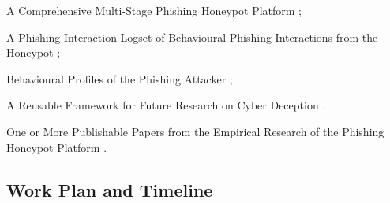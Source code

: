 A Comprehensive Multi-Stage Phishing Honeypot Platform \cite{Moric2025Honeypots};

A Phishing Interaction Logset of Behavioural Phishing Interactions from the Honeypot \cite{Song2005HoneyStat};

Behavioural Profiles of the Phishing Attacker \cite{Holz2006AttackPatterns};

A Reusable Framework for Future Research on Cyber Deception \cite{Moric2025Honeypots,Bringer2012HoneypotSurvey}.

One or More Publishable Papers from the Empirical Research of the Phishing Honeypot Platform \cite{Moric2025Honeypots}.






\subsection{Work Plan and Timeline}

